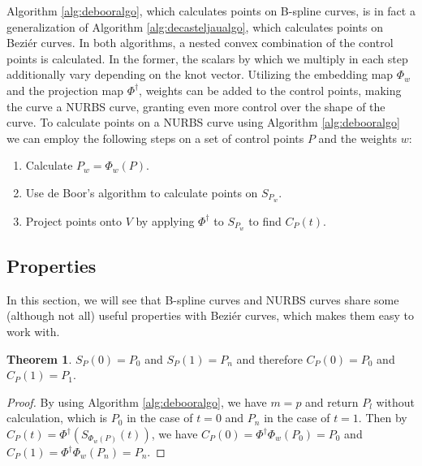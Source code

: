 \documentclass[a4paper, 11pt]{report}
\theoremstyle{definition}
\newtheorem{theorem}[definition]{Theorem}
\begin{document}
Algorithm \ref{alg:debooralgo}, which calculates points on B-spline curves, is in fact a generalization of Algorithm \ref{alg:decasteljaualgo}, which calculates points on Beziér curves. In both algorithms, a nested convex combination of the control points is calculated. In the former, the scalars by which we multiply in each step additionally vary depending on the knot vector. Utilizing the embedding map $\Phi_w$ and the projection map $\Phi^\dagger$, weights can be added to the control points, making the curve a NURBS curve, granting even more control over the shape of the curve. To calculate points on a NURBS curve using Algorithm \ref{alg:debooralgo} we can employ the following steps on a set of control points $P$ and the weights $w$:
\begin{enumerate}
	\item Calculate $P_w = \Phi_w(P)$.
	\item Use de Boor's algorithm to calculate points on $S_{P_w}$.
	\item Project points onto $V$ by applying $\Phi^\dagger$ to $S_{P_w}$ to find $C_P(t)$.
\end{enumerate}

\subsection{Properties}
In this section, we will see that B-spline curves and NURBS curves share some (although not all) useful properties with Beziér curves, which makes them easy to work with.

\begin{theorem}
	$S_P(0) = P_0$ and $S_P(1) = P_n$ and therefore $C_P(0) = P_0$ and $C_P(1) = P_1$.
\end{theorem}
\begin{proof}
	By using Algorithm \ref{alg:debooralgo}, we have $m = p$ and return $P_l$ without calculation, which is $P_0$ in the case of $t = 0$ and $P_n$ in the case of $t = 1$. Then by $C_P(t) = \Phi^\dagger(S_{\Phi_w(P)}(t))$, we have $C_P(0) = \Phi^\dagger\Phi_w(P_0) = P_0$ and $C_P(1) = \Phi^\dagger\Phi_w(P_n) = P_n$.
\end{proof}
\end{document}
